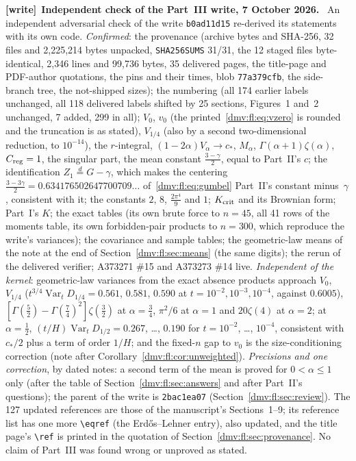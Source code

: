 \documentclass[11pt,letterpaper]{article}
\numberwithin{equation}{section}
\theoremstyle{definition}\newtheorem{definition}[theorem]{Definition}
\theoremstyle{remark}\newtheorem{remark}[theorem]{Remark}
\newcommand{\file}[1]{\nolinkurl{#1}}
\newenvironment{writenote}[1][]{\par\smallskip\begingroup\small
 \noindent\textbf{[write]}\if\relax\detokenize{#1}\relax\else~\textbf{#1.}\fi\ }%
 {\par\endgroup\smallskip}
\DeclareMathOperator{\Var}{Var}
\begin{document}
\begin{writenote}[Independent check of the Part~III write, 7 October 2026]
An independent adversarial check of the write \file{b0ad11d15} re-derived
its statements with its own code. \emph{Confirmed}: the provenance
(archive bytes and SHA-256, 32 files and 2,225,214 bytes unpacked,
\file{SHA256SUMS} 31/31, the 12 staged files byte-identical, 2,346 lines and
99,736 bytes, 35 delivered pages, the title-page and PDF-author quotations,
the pins and their times, blob \file{77a379cfb}, the side-branch tree, the
not-shipped sizes); the numbering (all 174 earlier labels unchanged, all 118
delivered labels shifted by 25 sections, Figures~1 and~2 unchanged, 7
added, 299 in all); $V_0$, $v_0$ (the printed~\eqref{dmv:fl:eq:vzero} is
rounded and the truncation is as stated), $V_{1/4}$ (also by a second
two-dimensional reduction, to $10^{-14}$), the $r$-integral,
$(1-2\alpha)V_\alpha\to c_*$, $M_\alpha$, $\Gamma(\alpha+1)\zeta(\alpha)$,
$C_{\rm reg}=1$, the singular part, the mean constant $\tfrac{3-\gamma}2$,
equal to Part~II's $c$; the identification $Z_1\overset{d}{=}G-\gamma$,
which makes the centering $\tfrac{3-3\gamma}2=0.634176502647700709\ldots$
of~\eqref{dmv:fl:eq:gumbel} Part~II's constant minus~$\gamma$, consistent
with it; the constants $2$, $8$, $\tfrac{2\pi^4}9$ and $1$; $K_{\rm crit}$
and its Brownian form; Part~I's $K$; the exact tables (its own brute force
to $n=45$, all 41 rows of the moments table, its own forbidden-pair products
to $n=300$, which reproduce the write's variances); the covariance and
sample tables; the geometric-law means of the note at the end of
Section~\ref{dmv:fl:sec:means} (the same digits); the rerun of the
delivered verifier; A373271 \#15 and A373273 \#14 live. \emph{Independent of
the kernel}: geometric-law variances from the exact absence products
approach $V_0$, $V_{1/4}$ ($t^{3/4}\Var_tD_{1/4}=0.561$, $0.581$, $0.590$ at
$t=10^{-2},10^{-3},10^{-4}$, against $0.6005$),
$[\Gamma(\tfrac52)-\Gamma(\tfrac74)^2]\zeta(\tfrac32)$ at $\alpha=\tfrac34$,
$\pi^2/6$ at $\alpha=1$ and $20\zeta(4)$ at $\alpha=2$; at $\alpha=\tfrac12$,
$(t/H)\Var_tD_{1/2}=0.267$, \ldots, $0.190$ for $t=10^{-2}$, \ldots,
$10^{-4}$, consistent with $c_*/2$ plus a term of order $1/H$; and the
fixed-$n$ gap to $v_0$ is the size-conditioning correction (note after
Corollary~\ref{dmv:fl:cor:unweighted}). \emph{Precisions and one
correction}, by dated notes: a second term of the mean is proved for
$0<\alpha\le1$ only (after the table of Section~\ref{dmv:fl:sec:answers}
and after Part~II's questions); the parent of the write is \file{2bac1ea07}
(Section~\ref{dmv:fl:sec:review}). The 127 updated references are those of
the manuscript's Sections~1--9; its reference list has one more
\verb|\eqref| (the Erd\H{o}s--Lehner entry), also updated, and the title
page's \verb|\ref| is printed in the quotation of
Section~\ref{dmv:fl:sec:provenance}. No claim of Part~III was found wrong
or unproved as stated.
\end{writenote}
\end{document}

